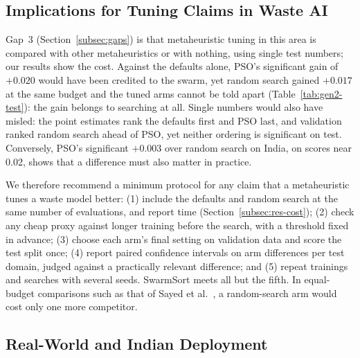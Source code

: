 \subsection{Implications for Tuning Claims in Waste AI}
\label{subsec:implications}

Gap~3 (Section~\ref{subsec:gaps}) is that metaheuristic tuning in this area is compared with other metaheuristics or with nothing, using single test numbers; our results show the cost. Against the defaults alone, PSO's significant \gentwo gain of $+0.020$ \mapfifty would have been credited to the swarm, yet random search gained $+0.017$ at the same budget and the tuned arms cannot be told apart (Table~\ref{tab:gen2-test}): the gain belongs to searching at all. Single numbers would also have misled: the \genone point estimates rank the defaults first and PSO last, and \gentwo validation ranked random search ahead of PSO, yet neither ordering is significant on test. Conversely, PSO's significant $+0.003$ over random search on India, on scores near 0.02, shows that a difference must also matter in practice.

We therefore recommend a minimum protocol for any claim that a metaheuristic tunes a waste model better: (1) include the defaults and random search at the same number of evaluations, and report time (Section~\ref{subsec:res-cost}); (2) check any cheap proxy against longer training before the search, with a threshold fixed in advance; (3) choose each arm's final setting on validation data and score the test split once; (4) report paired confidence intervals on arm differences per test domain, judged against a practically relevant difference; and (5) repeat trainings and searches with several seeds. SwarmSort meets all but the fifth. In equal-budget comparisons such as that of Sayed et al.~\cite{sayed2024intelligent}, a random-search arm would cost only one more competitor.

\subsection{Real-World and Indian Deployment}
\label{subsec:deployment}

